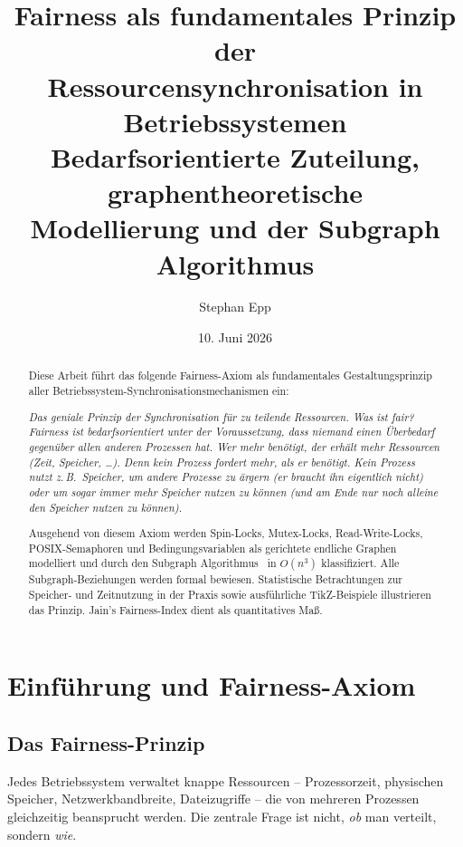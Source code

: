 ﻿\documentclass[a4paper,12pt]{article}
\title{\textbf{Fairness als fundamentales Prinzip der\\
Ressourcensynchronisation in Betriebssystemen}\\[0.4em]
\large Bedarfsorientierte Zuteilung, graphentheoretische\\
Modellierung und der Subgraph Algorithmus}
\author{Stephan Epp}
\date{10. Juni 2026}
\theoremstyle{definition}
\begin{document}
\maketitle

\begin{abstract}
Diese Arbeit führt das folgende Fairness-Axiom als fundamentales
Gestaltungsprinzip aller Betriebssystem-Synchronisationsmechanismen ein:

\medskip
\textit{Das geniale Prinzip der Synchronisation für zu teilende Ressourcen.
Was ist fair? Fairness ist bedarfsorientiert unter der Voraussetzung,
dass niemand einen Überbedarf gegenüber allen anderen Prozessen hat.
Wer mehr benötigt, der erhält mehr Ressourcen (Zeit, Speicher, \ldots).
Denn kein Prozess fordert mehr, als er benötigt. Kein Prozess nutzt
z.\,B.\ Speicher, um andere Prozesse zu ärgern (er braucht ihn eigentlich
nicht) oder um sogar immer mehr Speicher nutzen zu können (und am Ende
nur noch alleine den Speicher nutzen zu können).}

\medskip
Ausgehend von diesem Axiom werden Spin-Locks, Mutex-Locks,
Read-Write-Locks, POSIX-Semaphoren und Bedingungsvariablen als
gerichtete endliche Graphen modelliert und durch den Subgraph
Algorithmus~\cite{epp2026subgraph} in $O(n^3)$ klassifiziert.
Alle Subgraph-Beziehungen werden formal bewiesen.
Statistische Betrachtungen zur Speicher- und Zeitnutzung in der Praxis
sowie ausführliche TikZ-Beispiele illustrieren das Prinzip.
Jain's Fairness-Index dient als quantitatives Maß.
\end{abstract}

\tableofcontents
\newpage

\section{Einführung und Fairness-Axiom}
\label{sec:einf}

\subsection{Das Fairness-Prinzip}

Jedes Betriebssystem verwaltet knappe Ressourcen -- Prozessorzeit,
physischen Speicher, Netzwerkbandbreite, Dateizugriffe -- die von
mehreren Prozessen gleichzeitig beansprucht werden.
Die zentrale Frage ist nicht, \emph{ob} man verteilt, sondern \emph{wie}.
\end{document}
